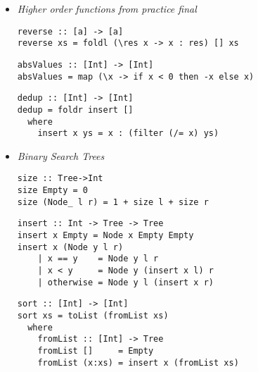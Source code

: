 \documentclass[landscape,8pt]{extarticle}
\begin{document}
\begin{multicols}{3}
\begin{itemize}
              \begin{lstlisting}
digitsOfInt :: Int -> [Int]
digitsOfInt n
    | n < 0     = []
    | n < 10    = [n]
    | otherwise = digitsOfInt (div n 10) ++ [mod n 10]

digits :: Int -> [Int]
digits n = digitsOfInt (abs n)
\end{lstlisting}
              \begin{lstlisting}
additivePersistence :: Int -> Int
additivePersistence n~
    | n < 10    = 0
    | otherwise = 1 + additivePersistence (sumList (digitsOfInt n))
\end{lstlisting}
              \begin{lstlisting}
digitalRoot :: Int -> Int
digitalRoot n
    | n < 10    = n
    | otherwise = digitalRoot (sumList (digitsOfInt n))
\end{lstlisting}
              \begin{lstlisting}
listReverse :: [a] -> [a]
listReverse []      = []
listReverse (x:xs)  = listReverse xs ++ [x]
\end{lstlisting}
\item \emph{Higher order functions from practice final}
\begin{lstlisting}
reverse :: [a] -> [a]
reverse xs = foldl (\res x -> x : res) [] xs
\end{lstlisting}
\begin{lstlisting}
absValues :: [Int] -> [Int]
absValues = map (\x -> if x < 0 then -x else x)
\end{lstlisting}
\begin{lstlisting}
dedup :: [Int] -> [Int]
dedup = foldr insert []
  where
    insert x ys = x : (filter (/= x) ys)
\end{lstlisting}
        \item \emph{Binary Search Trees}
              \begin{lstlisting}
size :: Tree->Int
size Empty = 0
size (Node_ l r) = 1 + size l + size r
\end{lstlisting}
              \begin{lstlisting}
insert :: Int -> Tree -> Tree
insert x Empty = Node x Empty Empty
insert x (Node y l r)
    | x == y    = Node y l r
    | x < y     = Node y (insert x l) r
    | otherwise = Node y l (insert x r)
\end{lstlisting}
              \begin{lstlisting}
sort :: [Int] -> [Int]
sort xs = toList (fromList xs)
  where
    fromList :: [Int] -> Tree
    fromList []     = Empty
    fromList (x:xs) = insert x (fromList xs)


\end{lstlisting}
\end{itemize}
\end{multicols}
\end{document}
